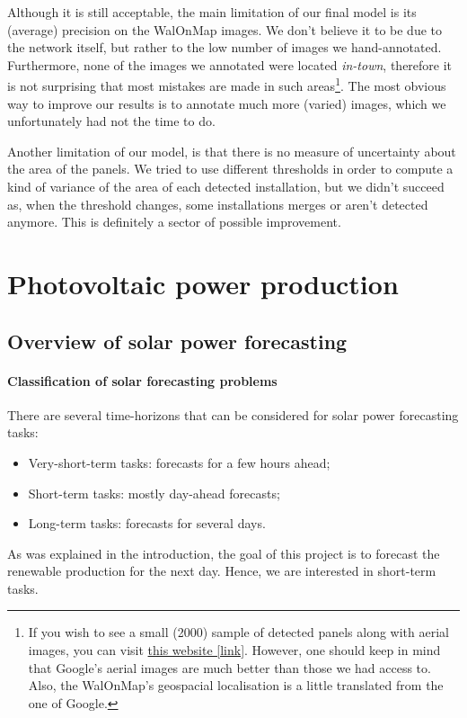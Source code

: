 \documentclass[a4paper, 12pt]{article}
\begin{document}
Although it is still acceptable, the main limitation of our final model is its (average) precision on the WalOnMap images. We don't believe it to be due to the network itself, but rather to the low number of images we hand-annotated. Furthermore, none of the images we annotated were located \emph{in-town}, therefore it is not surprising that most mistakes are made in such areas\footnote{If you wish to see a small (2000) sample of detected panels along with aerial images, you can visit \href{https://www.google.com/maps/d/viewer?mid=1ja5gFenQXNE9TB1rDLuuQsO-H1HH77Jj&usp=sharing}{this website [link]}. However, one should keep in mind that Google's aerial images are much better than those we had access to. Also, the WalOnMap's geospacial localisation is a little translated from the one of Google.}. The most obvious way to improve our results is to annotate much more (varied) images, which we unfortunately had not the time to do.

Another limitation of our model, is that there is no measure of uncertainty about the area of the panels. We tried to use different thresholds in order to compute a kind of variance of the area of each detected installation, but we didn't succeed as, when the threshold changes, some installations merges or aren't detected anymore. This is definitely a sector of possible improvement.

\newpage

\section{Photovoltaic power production}\label{sec:pv_power}

\subsection{Overview of solar power forecasting}

\paragraph{Classification of solar forecasting problems}
There are several time-horizons that can be considered for solar power forecasting tasks:
\begin{itemize}
    \item Very-short-term tasks: forecasts for a few hours ahead;
    \item Short-term tasks: mostly day-ahead forecasts;
    \item Long-term tasks: forecasts for several days.
\end{itemize}
As was explained in the introduction, the goal of this project is to forecast the renewable production for the next day. Hence, we are interested in short-term tasks.
\end{document}

